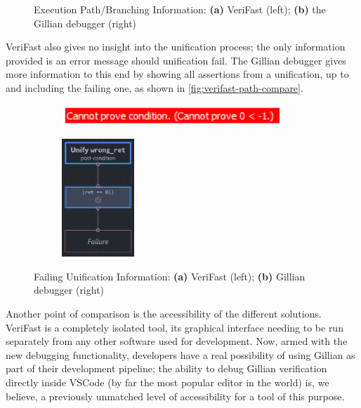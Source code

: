 \begin{figure}
\begin{subfigure}[b]{0.4\textwidth}
  \end{subfigure}
  \caption{Execution Path/Branching Information: \textbf{(a)} VeriFast (left); 
  \textbf{(b)} the Gillian debugger (right)}%
  \label{fig:verifast-path-compare}
\end{figure}

VeriFast also gives no insight into the unification process; the only
information provided is an error message should unification fail. The Gillian
debugger gives more information to this end by showing all assertions from
a unification, up to and including the failing one, as shown in
\autoref{fig:verifast-path-compare}.

\begin{figure}
  \centering
  \begin{subfigure}[b]{0.4\textwidth}
    \center{}
    \includegraphics[width=0.9\textwidth]{img/verifast-error.png}
  \end{subfigure}
  \qquad
  \begin{subfigure}[b]{0.4\textwidth}
    \centering
    \includegraphics[width=0.3\textwidth]{img/unifymap-failure.png}
  \end{subfigure}
  \caption{Failing Unification Information: \textbf{(a)} VeriFast (left);
  \textbf{(b)} Gillian debugger (right)}%
  \label{fig:verifast-unifyfail-compare}
\end{figure}

Another point of comparison is the accessibility of the different solutions.
VeriFast is a completely isolated tool, its graphical interface needing to be
run separately from any other software used for development. Now, armed with the
new debugging functionality, developers have a real possibility of using Gillian
as part of their development pipeline; the ability to debug Gillian verification
directly inside VSCode (by far the most popular editor in the world) is, we
believe, a previously unmatched level of accessibility for a tool of this
purpose.


